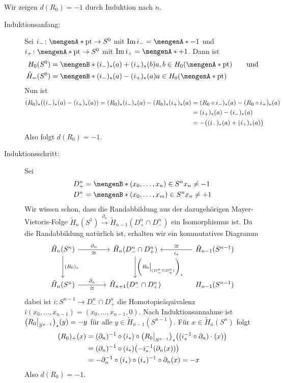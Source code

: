 Wir zeigen $d(R_0)= -1$ durch Induktion nach $n$.
\begin{description}
	\item[Induktionsanfang:] Sei $i_- \colon \set{\mathrm{pt}} \to S^0$ mit $\im i_- = \set{-1}$ und $i_+ \colon\set{\mathrm{pt}} \to S^0 $ mit $\im i_+ = \set{+1}$. Dann ist
	\begin{align*}
		H_0(S^0) &= \set[(i_-)_*(a)+ (i_+)_*(b)]{a,b \in H_0(\set{\mathrm{pt}})} \qquad \text{und}\\
		\tilde{H}_=(S^0) &= \set[(i_-)_*(a)- (i_+)_*(a)]{a \in H_0(\set{\mathrm{pt}})}
	\end{align*}
	Nun ist
	\begin{align*}
		(R_0)_* \enbrace*{(i_-)_*(a)- (i_+)_*(a)} = (R_0)_* (i_-)_* (a) - (R_0)_* (i_+)_* (a) &= (R_0 \circ i_-)_*(a) - (R_0 \circ i_+)_*(a)\\ 
		&= (i_+)_*(a) - (i_-)_*(a) \\ 
		&= - \enbrace[\big]{(i_-)_*(a) + (i_+)_*(a)} 
	\end{align*}
	Also folgt $d(R_0)=-1$.
	\item[Induktionsschritt:] Sei 
	\begin{align*}
		D_+^n &= \set[(x_0, \ldots , x_n) \in S^n]{x_n \not= -1} \\
		D_-^n &= \set[(x_0, \ldots , x_m) \in S^n]{x_n \not= +1}  
	\end{align*}
	Wir wissen schon, dass die Randabbildung aus der dazugehörigen Mayer-Vietoris-Folge $\tilde{H}_n(S^1) \xrightarrow{\partial_n} \tilde{H}_{n-1}(D^n_+ \cap D_-^n)$ ein 
	Isomorphismus ist. Da die Randabbildung natürlich ist, erhalten wir ein kommutatives Diagramm
	\[
		\begin{tikzcd}[row sep=3em, column sep=4em]
			\tilde{H}_n(S^n) \rar["\partial_n", "\cong"'] \dar["(R_0)_*"]
			& \tilde{H}_{n}(D^n_- \cap D^n_+) \dar["\enbrace*{R_0\big|_{(D^n_- \cap D^n_+)}}_*"]  
			& \tilde{H}_{n-1}(S^{n-1}) \lar["i_*", "\cong"'] \\
			\tilde{H}_n(S^n) \rar["\partial_n", "\cong"']
			& \tilde{H}_{n+1}(D^n_- \cap D^n_+) 
			& H_{n-1}(S^{n-1})
		\end{tikzcd}
	\]
	dabei ist $i\colon S^{n-1} \to D^n_- \cap D_+^n$ die Homotopieäquivalenz $i(x_0, \ldots , x_{n-1}) = (x_0, \ldots , x_{n-1},0)$.
	Nach Induktionsannahme ist $\enbrace*{R_0\big|_{S^{n-1}}}_*(y)= -y$ für alle $y \in \tilde{H}_{n-1}(S^{n-1})$. Für $x \in \tilde{H}_n(S^n)$ folgt
	\begin{align*}
		(R_0)_+(x) &= (\partial_n) ^{-1} \circ  (i_*) \circ \enbrace*{R_0\big|_{S^{n-1}}}_* \enbrace[\big]{(i_* ^{-1} \circ \partial_n) \cdot (x)} \\
		&= (\partial_n) ^{-1} \circ (i_*) \enbrace*{- i_*^{-1} \enbrace*{\partial_n (x)} } \\
		&= - \partial_n ^{-1} \circ (i_*) \circ (i_*)^{-1} \circ \partial_n(x)= -x 
	\end{align*}
	Also $d(R_0)=-1$. \bewende
\end{description}

